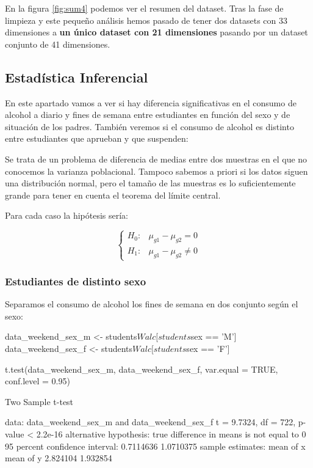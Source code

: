 \documentclass[12pt,a4paper]{article}
\begin{document}
En la figura \ref{fig:sum4} podemos ver el resumen del dataset. Tras la fase de limpieza y este pequeño análisis hemos pasado de tener dos datasets con 33 dimensiones a \textbf{un único dataset con 21 dimensiones} pasando por un dataset conjunto de 41 dimensiones.  



\subsection{ Estadística Inferencial}
En este apartado vamos a ver si hay diferencia significativas en el consumo de alcohol a diario y fines de semana entre estudiantes en función del sexo y de situación de los padres. También veremos si el consumo de alcohol es distinto entre estudiantes que aprueban y que suspenden:
  
Se trata de un problema de diferencia de medias entre dos muestras en el que no conocemos la varianza poblacional. Tampoco sabemos a priori si los datos siguen una distribución normal, pero el tamaño de las muestras es lo suficientemente grande para tener en cuenta el teorema del límite central.


Para cada caso la hipótesis sería: 

$$
\left\{
\begin{array}{ll}
H_{0}: &  \mu_{g1}-\mu_{g2}=0\\
H_{1}: & \mu_{g1}-\mu_{g2}\ne0
\end{array}
\right.
$$


\subsubsection{Estudiantes de distinto sexo}

Separamos el consumo de alcohol los fines de semana en dos conjunto según el sexo:

\begin{spverbatim}
data_weekend_sex_m <- students$Walc[students$sex == 'M'] 
data_weekend_sex_f <- students$Walc[students$sex == 'F'] 

t.test(data_weekend_sex_m, data_weekend_sex_f, var.equal = TRUE, conf.level = 0.95)

Two Sample t-test

data:  data_weekend_sex_m and data_weekend_sex_f
t = 9.7324, df = 722, p-value < 2.2e-16
alternative hypothesis: true difference in means is not equal to 0
95 percent confidence interval:
 0.7114636 1.0710375
sample estimates:
mean of x mean of y 
 2.824104  1.932854
\end{spverbatim}
\end{document}
